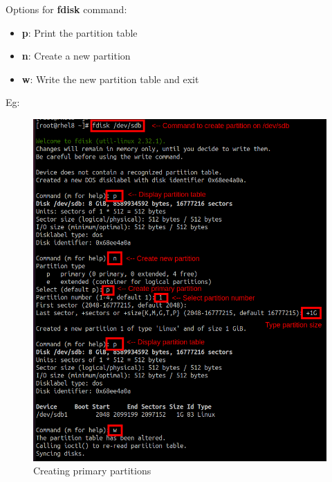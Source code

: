 \begin{flushleft}
	Options for \textbf{fdisk} command:
	\begin{itemize}
		\item \textbf{p}: Print the partition table
		\item \textbf{n}: Create a new partition
		\item \textbf{w}: Write the new partition table and exit
	\end{itemize}

	Eg:
	\begin{figure}[h!]
		\centering
		\includegraphics[scale=.4]{content/chapter8/images/primary_fdisk.png}
		\caption{Creating primary partitions}
		\label{pp}
	\end{figure}		
			
	
\end{flushleft}

\newpage

